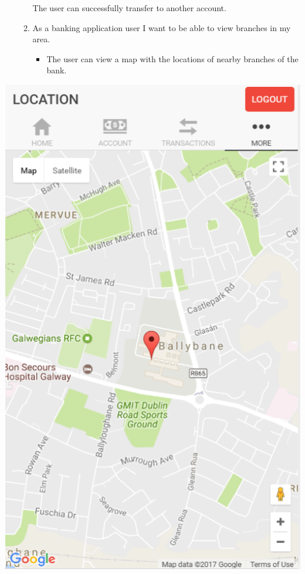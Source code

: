 \begin{itemize}
\begin{enumerate}
\begin{center}
\end{center}
        The user can successfully transfer to another account.
        \item As a banking application user I want to be able to view branches in my area.
            \begin{itemize}
                \item The user can view a map with the locations of nearby branches of the bank.
            \end{itemize}
        \end{enumerate}
    \end{itemize}
\begin{center}    
    \includegraphics[scale=0.5]{img/Locations.png}
\end{center}

